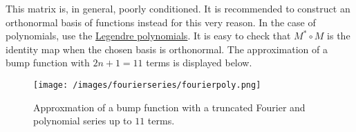 This matrix is, in general, poorly conditioned.
It is recommended to construct an orthonormal basis of functions instead for this very reason.
In the case of polynomials, use the \href{https://en.wikipedia.org/wiki/Legendre_polynomials}{Legendre polynomials}.
It is easy to check that \(M^* \circ M\) is the identity map when the chosen basis is orthonormal.
The approximation of a bump function with \(2n + 1 = 11\) terms is displayed below.
%
\begin{figure}
  \texttt{[image: /images/fourierseries/fourierpoly.png]}
  \caption{Approxmation of a bump function with a truncated Fourier and polynomial series up to \(11\) terms.}
\end{figure}
%
